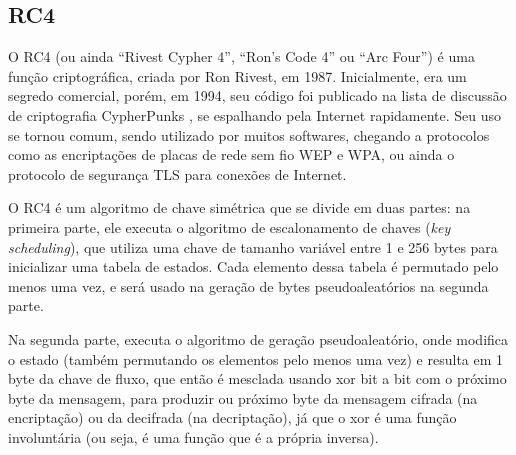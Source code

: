
\subsection*{RC4}

O RC4 (ou ainda ``Rivest Cypher 4'', ``Ron's Code 4'' ou ``Arc Four'') é uma função
criptográfica, criada por Ron Rivest, em 1987. Inicialmente, era um segredo comercial,
porém, em 1994, seu código foi publicado na lista de discussão de criptografia
CypherPunks \cite{site:rc4-code}, se espalhando pela Internet rapidamente. Seu uso se
tornou comum, sendo utilizado por muitos softwares, chegando a protocolos como as
encriptações de placas de rede sem fio WEP e WPA, ou ainda o protocolo de segurança TLS
para conexões de Internet.

O RC4 é um algoritmo de chave simétrica que se divide em duas partes: na primeira
parte, ele executa o algoritmo de escalonamento de chaves (\emph{key scheduling}),
que utiliza uma chave de tamanho variável entre 1 e 256 bytes para inicializar uma
tabela de estados. Cada elemento dessa tabela é permutado pelo menos uma vez, e será
usado na geração de bytes pseudoaleatórios na segunda parte.

Na segunda parte, executa o algoritmo de geração pseudoaleatório, onde modifica o estado
(também permutando os elementos pelo menos uma vez) e resulta em 1 byte da chave de
fluxo, que então é mesclada usando \gls{xor} bit a bit com o próximo byte da mensagem,
para produzir ou próximo byte da mensagem cifrada (na encriptação) ou da decifrada (na
decriptação), já que o \gls*{xor} é uma função involuntária (ou seja, é uma função que
é a própria inversa).




